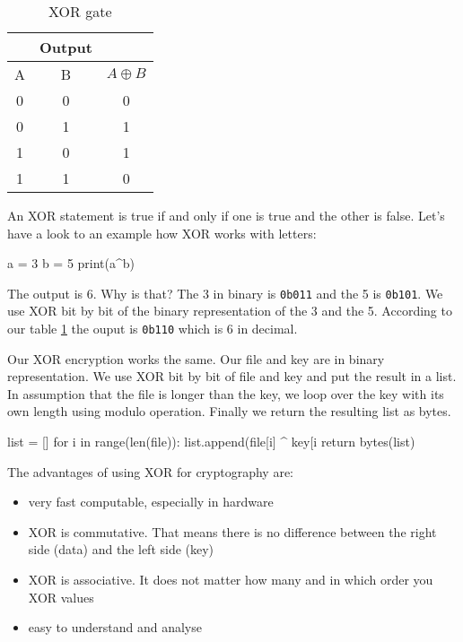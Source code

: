 \documentclass[]{article}
\begin{document}
\begin{table}[h]
    \centering
    \begin{tabular}{|c|c|c|}
        \hline
        \rowcolor{blue2} \multicolumn{2}{|c|}{\textbf{Input}} & \textbf{Output} \\
        \hline
        \rowcolor{blue2} A & B & $A \oplus B$ \\
        \hline
        \rowcolor{red2} 0 & 0 & 0 \\
        \hline
        \rowcolor{green2} 0 & 1 & 1 \\
        \hline
        \rowcolor{green2} 1 & 0 & 1 \\
        \hline
        \rowcolor{red2} 1 & 1 & 0 \\
        \hline
    \end{tabular}
    \caption{XOR gate}
    \label{tab:xor}
    \cite{enwiki:1139577080}
\end{table}

An XOR statement is true if and only if one is true and the other is false. Let's have a look to an example
how XOR works with letters:

\begin{python}
a = 3
b = 5
print(a^b)
\end{python}

\noindent The output is 6. Why is that? The 3 in binary is \texttt{0b011} and the 5 is \texttt{0b101}. We use 
XOR bit by bit of the binary representation of the 3 and the 5. According to our
table \ref{tab:xor} the ouput is \texttt{0b110} which is 6 in decimal. \cite{delft}

Our XOR encryption works the same. Our file and key are in binary representation. We use XOR bit by bit of 
file and key and put the result in a list. In assumption that the file is longer than the key, we loop over
the key with its own length using modulo operation. Finally we return the resulting list as bytes.
\cite{geek}
\begin{python}
list = []  
for i in range(len(file)):
    list.append(file[i] ^ key[i %
return bytes(list)
\end{python} 


The advantages of using XOR for cryptography are:
\begin{itemize}
    \item very fast computable, especially in hardware
    \item XOR is commutative. That means there is no difference between the right side (data) and the left side (key)
    \item XOR is associative. It does not matter how many and in which order you XOR values
    \item easy to understand and analyse
\end{itemize}
\end{document}
